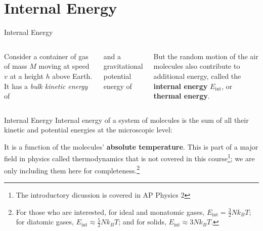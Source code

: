 \documentclass[12pt,compress,aspectratio=169]{beamer}
\begin{document}
\section{Internal Energy}

\begin{frame}{Internal Energy}
  \begin{columns}

    Consider a container of gas of mass $M$ moving at speed $v$ at a height $h$
    above Earth. It has a \emph{bulk kinetic energy} of

    
    and a gravitational potential energy of


    \vspace{-.1in}But the random motion of the air molecules also contribute to
    additional energy, called the \textbf{internal energy} $E_\text{int}$, or
    \textbf{thermal energy}.
  \end{columns}
\end{frame}



\begin{frame}{Internal Energy}
  Internal energy of a system of molecules is the sum of all their kinetic and
  potential energies at the microscopic level:
  

  It is a function of the molecules' \textbf{absolute temperature}. This is
  part of a major field in physics called thermodynamics that is not covered in
  this course\footnote{The introductory dicussion is covered in AP Physics 2};
  we are only including them here for completeness.\footnote{For those who are
  interested, for ideal and monatomic gases, $E_\text{int}=\frac32Nk_BT$; for
  diatomic gases, $E_\text{int}\approx\frac52Nk_BT$; and for solids,
  $E_\text{int}\approx3Nk_BT$.}
\end{frame}
\end{document}

